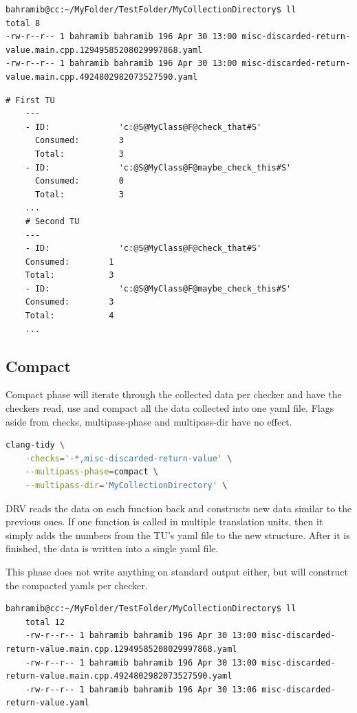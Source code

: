 \begin{lstlisting}[caption={The yaml files containing the collection data},captionpos=b]
bahramib@cc:~/MyFolder/TestFolder/MyCollectionDirectory$ ll
total 8
-rw-r--r-- 1 bahramib bahramib 196 Apr 30 13:00 misc-discarded-return-value.main.cpp.12949585208029997868.yaml
-rw-r--r-- 1 bahramib bahramib 196 Apr 30 13:00 misc-discarded-return-value.main.cpp.4924802982073527590.yaml
\end{lstlisting}

\begin{lstlisting}[caption={Contents of the collection files},captionpos=b]
	# First TU
	---
	- ID:              'c:@S@MyClass@F@check_that#S'
	  Consumed:        3
	  Total:           3
	- ID:              'c:@S@MyClass@F@maybe_check_this#S'
	  Consumed:        0
	  Total:           3
	...
	# Second TU
	---
	- ID:              'c:@S@MyClass@F@check_that#S'
	Consumed:        1
	Total:           3
	- ID:              'c:@S@MyClass@F@maybe_check_this#S'
	Consumed:        3
	Total:           4
	...
\end{lstlisting}

\subsection{Compact}

Compact phase will iterate through the collected data per checker and have the checkers read, use and compact all the data collected
into one yaml file. Flags aside from checks, multipass-phase and multipass-dir have no effect.

\begin{lstlisting}[language={bash}]
	clang-tidy \
	-checks='-*,misc-discarded-return-value' \
	--multipass-phase=compact \
	--multipass-dir='MyCollectionDirectory' \
\end{lstlisting}

DRV reads the data on each function back and constructs new data similar to the previous ones. If one function is called in multiple
translation units, then it simply adds the numbers from the TU's yaml file to the new structure. After it is finished, the data is
written into a single yaml file.
\par This phase does not write anything on standard output either, but will construct the compacted yamls per checker.

\begin{lstlisting}[caption={The new file containing the collected data},captionpos=b]
	bahramib@cc:~/MyFolder/TestFolder/MyCollectionDirectory$ ll
	total 12
	-rw-r--r-- 1 bahramib bahramib 196 Apr 30 13:00 misc-discarded-return-value.main.cpp.12949585208029997868.yaml
	-rw-r--r-- 1 bahramib bahramib 196 Apr 30 13:00 misc-discarded-return-value.main.cpp.4924802982073527590.yaml
	-rw-r--r-- 1 bahramib bahramib 196 Apr 30 13:06 misc-discarded-return-value.yaml
\end{lstlisting}


